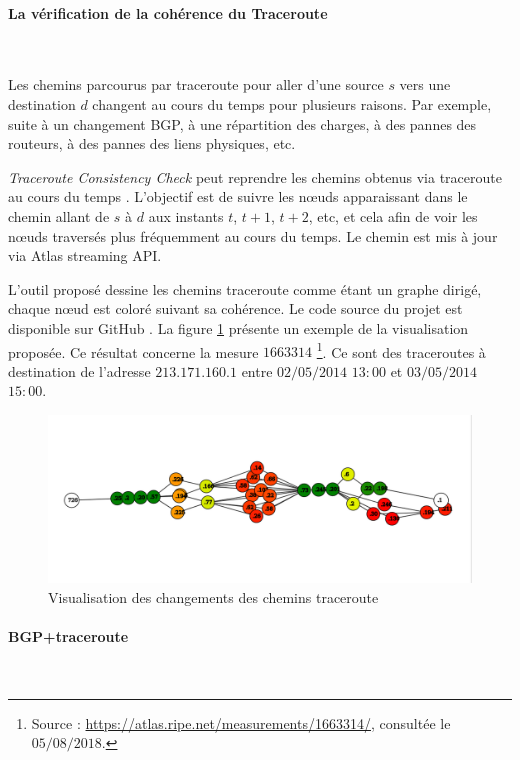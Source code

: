 \paragraph{La vérification de la cohérence du Traceroute}~

Les chemins parcourus par traceroute pour aller d'une source $s$ vers une destination $d$ changent au cours du temps pour plusieurs raisons. Par exemple, suite   à un changement BGP, à une  répartition des charges, à des pannes des routeurs,  à des pannes des liens physiques, etc.

\textit{Traceroute Consistency Check} peut reprendre les chemins obtenus via traceroute au cours du temps . L'objectif est de suivre les  n\oe{}uds apparaissant dans le chemin allant de  $s$ à $d$ aux instants $t$, $t+1$, $t+2$, etc, et cela afin de voir les n\oe{}uds traversés plus fréquemment au cours du temps. Le chemin est mis à jour via Atlas streaming API. 

L'outil proposé dessine les chemins traceroute comme étant un graphe dirigé, chaque n\oe{}ud est coloré suivant sa cohérence. Le code source du projet est disponible sur GitHub \cite{Traceroute-consistency-check}. La figure \ref{fig:Traceroute-consistency-check} présente un exemple de la visualisation proposée. Ce résultat concerne la mesure $1663314$ \footnote{Source : \url{https://atlas.ripe.net/measurements/1663314/}, consultée le $05/08/2018$.}. Ce sont des traceroutes à destination de l'adresse $213.171.160.1$ entre $02/05/2014$ $13:00$ et $03/05/2014$ $15:00$.

\begin{figure}[H]
	\centering
	\includegraphics[width=1\linewidth]{illustrations/traceroute-consitance.png}
	\caption{Visualisation des changements des chemins traceroute \cite{Traceroute-consistency-check}}
	\label{fig:Traceroute-consistency-check}
\end{figure}

\paragraph{BGP+traceroute} ~

